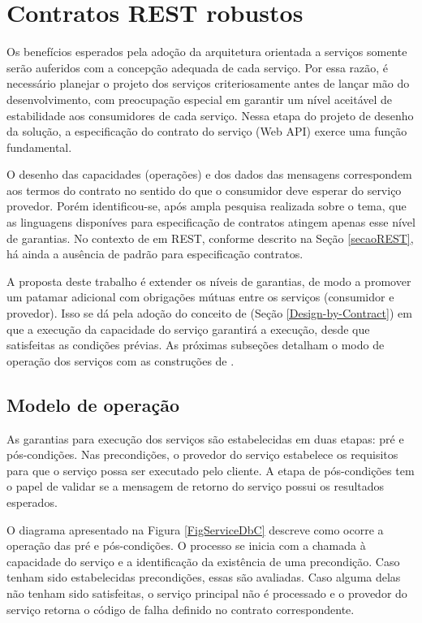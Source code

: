 \section{Contratos REST robustos}


Os benefícios esperados pela adoção da arquitetura orientada a serviços
somente serão auferidos com a concepção adequada de cada serviço. 
Por essa razão, é necessário planejar o projeto dos serviços criteriosamente
antes de lançar mão do desenvolvimento, com preocupação especial em garantir
um nível aceitável de estabilidade aos consumidores de cada serviço.
Nessa etapa do projeto de desenho da solução, a especificação do contrato do
serviço (Web API) exerce uma função fundamental. 

O desenho das
capacidades (operações) e dos dados das mensagens correspondem aos
termos do contrato no sentido do que o consumidor deve esperar do serviço
provedor. Porém identificou-se, após ampla pesquisa realizada sobre o tema, que
as linguagens disponíves para especificação de contratos atingem apenas esse
nível de garantias. No contexto de \wss{} em REST, conforme descrito na
Seção \ref{secaoREST}, há ainda a ausência de padrão para especificação
contratos.

A proposta deste trabalho é extender os níveis de garantias, de modo a promover
um patamar adicional com obrigações mútuas entre os serviços (consumidor e
provedor). Isso se dá pela adoção do conceito de \designbycontract{} (Seção 
\ref{Design-by-Contract}) em que a execução da capacidade do serviço garantirá 
a execução, desde que satisfeitas as condições prévias. As próximas subseções 
detalham o modo de operação dos serviços com as construções de \designbycontract{}.

\subsection{Modelo de operação}


As garantias para execução dos serviços são estabelecidas em duas etapas: pré e
pós-condições. Nas precondições, o provedor do serviço estabelece os requisitos
para que o serviço possa ser executado pelo cliente. A etapa de pós-condições
tem o papel de validar se a mensagem de retorno do serviço possui os resultados
esperados.

O diagrama apresentado na Figura \ref{FigServiceDbC} descreve como ocorre a
operação das pré e pós-condições. O processo se inicia com a chamada à capacidade do serviço e a
identificação da existência de uma precondição. Caso tenham sido estabelecidas 
precondições, essas são avaliadas. Caso alguma delas não tenham sido
satisfeitas, o serviço principal não é processado e o provedor do serviço
retorna o código de falha definido no contrato correspondente.



